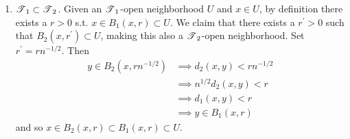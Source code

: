 \begin{solution}[Munkres 20.1.a]
\begin{enumerate}
      \item $\operatorname{\mathscr{T}}_1 \subset \operatorname{\mathscr{T}}_2$. Given an $\operatorname{\mathscr{T}}_1$-open neighborhood $U$ and $x \in U$, by definition there exists a $r > 0$ s.t. $x \in B_1 (x, r) \subset U$. We claim that there exists a $r^\prime > 0$ such that $B_2 (x, r^\prime) \subset U$, making this also a $\operatorname{\mathscr{T}}_2$-open neighborhood. Set $r^\prime = r n^{-1/2}$. Then 
      \begin{align}
        y \in B_2 (x, r n^{-1/2}) & \implies d_2 (x, y) < r n^{-1/2} \\
                                  & \implies n^{1/2} d_2 (x, y) < r \\ 
                                  & \implies d_1 (x, y) < r \\
                                  & \implies y \in B_1 (x, r) 
      \end{align}
      and so $x \in B_2 (x, r) \subset B_1 (x, r) \subset U$. 
    \end{enumerate}  
  \end{solution}

